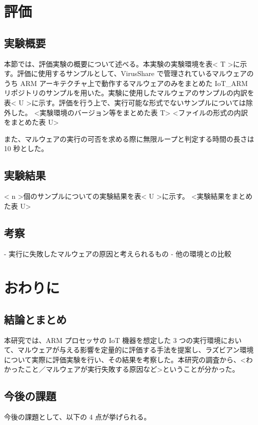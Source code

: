 \documentclass[12pt,a4paper,titlepage,report]{jsbook}
\begin{document}
\chapter{評価}
\section{実験概要}
本節では、評価実験の概要について述べる。本実験の実験環境を表< T >に示す。評価に使用するサンプルとして、VirusShare で管理されているマルウェアのうち ARM アーキテクチャ上で動作するマルウェアのみをまとめた IoT\_ARM リポジトリ\*のサンプルを用いた。実験に使用したマルウェアのサンプルの内訳を表< U >に示す。評価を行う上で、実行可能な形式でないサンプルについては除外した。
<実験環境のバージョン等をまとめた表 T>
<ファイルの形式の内訳をまとめた表 U>

また、マルウェアの実行の可否を求める際に無限ループと判定する時間の長さは 10 秒とした。

\section{実験結果}
< n >個のサンプルについての実験結果を表< U >に示す。
<実験結果をまとめた表 U>


\section{考察}
- 実行に失敗したマルウェアの原因と考えられるもの  
- 他の環境との比較

\chapter{おわりに}
\section{結論とまとめ}
本研究では、ARM プロセッサの IoT 機器を想定した 3 つの実行環境において、マルウェアが与える影響を定量的に評価する手法を提案し、ラズビアン環境について実際に評価実験を行い、その結果を考察した。本研究の調査から、<わかったこと／マルウェアが実行失敗する原因など>ということが分かった。

\section{今後の課題}
今後の課題として、以下の 4 点が挙げられる。
\end{document}
